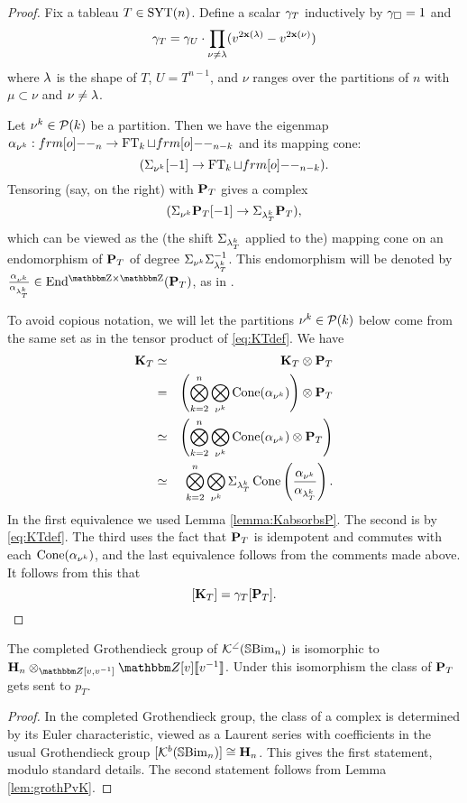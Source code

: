 \begin{proof}
Fix a tableau $T\in \operatorname{SYT}(n)$.  Define a scalar $\gamma_T$ inductively by $\gamma_{\square}=1$ and 
\[
\gamma_T =  \gamma_U \cdot \prod_{\nu\neq \lambda}(v^{2\mathbf{x}(\lambda)} - v^{2\mathbf{x}(\nu)})
\]
where $\lambda$ is the shape of $T$, $U=T^{n-1}$, and $\nu$ ranges over the partitions of $n$ with $\mu\subset \nu$ and $\nu\neq \lambda$. 

Let $\nu^k\in {\mathcal{P}}(k)$ be a partition.   Then we have the eigenmap $\a_{\nu^k}:\one_n\rightarrow \FT_k\sqcup \one_{n-k}$ and its mapping cone:
\[
(\Sigma_{\nu^k}[-1]\rightarrow \FT_k\sqcup \one_{n-k}).
\]
Tensoring (say, on the right) with ${\mathbf P}_T$ gives a complex
\[
(\Sigma_{\nu^k}{\mathbf P}_T[-1]\rightarrow \Sigma_{\lambda_T^k}{\mathbf P}_T),
\]
which can be viewed as the (the shift $\Sigma_{\lambda_T^k}$ applied to the) mapping cone on an endomorphism of ${\mathbf P}_T$ of degree $\Sigma_{\nu^k}\Sigma_{\lambda_T^k}^{-1}$.  This endomorphism will be denoted by $\frac{\a_{\nu^k}}{\a_{\l_T^k}}\in \Endgg(\PB_T)$, as in \cite[\S 7.4]{ElHog17a}.

To avoid copious notation, we will let the partitions $\nu^k \in {\mathcal{P}}(k)$ below come from the same set as in the tensor product of \eqref{eq:KTdef}. We have
\begin{eqnarray*}
{\mathbf K}_T &\simeq & {\mathbf K}_T\otimes {\mathbf P}_T\\
& =& \left(\bigotimes_{k=2}^n \bigotimes_{\nu^k} \operatorname{Cone}(\alpha_{\nu^k})\right)\otimes {\mathbf P}_T\\
& \simeq & \left(\bigotimes_{k=2}^n \bigotimes_{\nu^k} \operatorname{Cone}(\alpha_{\nu^k})\otimes {\mathbf P}_T\right)\\
& \simeq & \bigotimes_{k=2}^n \bigotimes_{\nu^k} \Sigma_{\lambda_T^k}\operatorname{Cone}\left(\frac{\alpha_{\nu^k}}{\alpha_{\lambda_T^k}}\right).\\
\end{eqnarray*}
In the first equivalence we used Lemma \ref{lemma:KabsorbsP}.  The second is by \eqref{eq:KTdef}.  The third uses the fact that ${\mathbf P}_T$ is idempotent and commutes with each $\operatorname{Cone}(\alpha_{\nu^k})$, and the last equivalence follows from the comments made above.  It follows from this that
\[
[{\mathbf K}_T]=\gamma_T [{\mathbf P}_T].
\]
\end{proof}

\begin{proposition}\label{prop:groth}
The completed Grothendieck group \cite{AchStr} of ${\mathcal{K}}^{\angle}({\mathbb{S}}{\rm Bim }_n)$ is isomorphic to $\HB_n\otimes_{\Z[v,v\inv]} \Z[v]\llbracket v\inv \rrbracket$.  Under this isomorphism the class of ${\mathbf P}_T$ gets sent to $p_T$.
\end{proposition}

\begin{proof}
In the completed Grothendieck group, the class of a complex is determined by its Euler characteristic, viewed as a Laurent series with coefficients in the usual Grothendieck group $[{\mathcal{K}}^b({\mathbb{S}}{\rm Bim }_n)]\cong {\mathbf H}_n$.  This gives the first statement, modulo standard details.  The second statement follows from Lemma \ref{lem:grothPvK}.
\end{proof}

